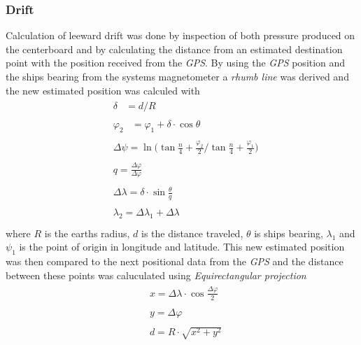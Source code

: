 \subsubsection{Drift}
Calculation of leeward drift was done by inspection of both pressure produced on the centerboard and by calculating the distance from an estimated destination point with the position received from the \textit{GPS}. By using the \textit{GPS} position and the ships bearing from the systems magnetometer a \textit{rhumb line}\cite{rhumb-line} was derived and the new estimated position was calculed with
\begin{align*}
  &\begin{aligned}
  \delta &= d/R 
  \end{aligned}\\
 &\begin{aligned}
  \varphi_2 &= \varphi_1 + \delta \cdot \cos{\theta}
  \end{aligned}\\
 &\begin{aligned}
  \Delta\psi = \ln { \bigg( \tan{\frac{n}{4} + \frac{\varphi_2}{2}} \bigg/ \tan{\frac{n}{4} + \frac{\varphi_1}{2}} \bigg)}
  \end{aligned}\\
 &\begin{aligned}
  q = \frac{\Delta\varphi}{\Delta\varphi}
  \end{aligned}\\
 &\begin{aligned}
  \Delta\lambda = \delta\cdot\sin\frac{\theta}{q}
  \end{aligned}\\
 &\begin{aligned}
  \lambda_2 = \Delta\lambda_1 + \Delta\lambda
  \end{aligned}\\
\end{align*}
where $R$ is the earths radius, $d$ is the distance traveled, $\theta$ is ships bearing, $\lambda_1$ and $\psi_1$ is the point of origin in longitude and latitude. This new estimated position was then compared to the next positional data from the \textit{GPS} and the distance between these points was caluculated using \textit{Equirectangular projection}\cite{equitriangular}
\begin{align*}
  &\begin{aligned}
  x = \Delta\lambda \cdot \cos\frac{\Delta\varphi}{2}
  \end{aligned}\\
 &\begin{aligned}
  y = \Delta\varphi
  \end{aligned}\\
 &\begin{aligned}
  d = R\cdot\sqrt{x^2+y^2}
  \end{aligned}\\
\end{align*}

